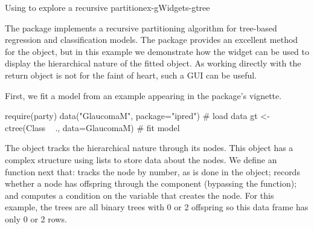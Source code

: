 \begin{example}{Using  to explore a recursive partition}{ex-gWidgets-gtree}

The  package implements a recursive partitioning algorithm
for tree-based regression and classification models. The package
provides an excellent  method for the object, but in this
example we demonstrate how the  widget can be used to
display the hierarchical nature of the fitted object. As working
directly with the return object is not for the faint of heart, such a
GUI can be useful.

First, we fit a model from an
example appearing in the package's vignette.

\begin{Schunk}
\begin{Sinput}
 require(party)
 data("GlaucomaM", package="ipred")      # load data
 gt <- ctree(Class ~ ., data=GlaucomaM)  # fit model
\end{Sinput}
\end{Schunk}

The  object tracks the hierarchical nature through its
nodes. This object has a complex structure using lists to store data
about the nodes. We define an  function next that:
tracks the node by number, as is done in the  object;
records whether a node has offspring through the 
component (bypassing the  function); and computes a
condition on the variable that creates the node. For this example, the
trees are all binary trees with 0 or 2 offspring so this data frame
has only 0 or 2 rows.

\begin{Schunk}
\end{Schunk}
\end{example}
